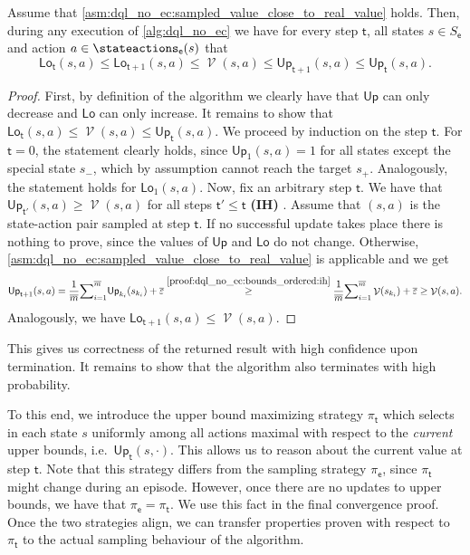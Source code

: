 \documentclass{theoretics}
\makeatletter
\newcommand{\States}{S}
\newcommand{\strategy}{\pi}
\DeclareMathOperator{\val}{\mathcal{V}}
\newcommand{\upperbound}{\mathsf{Up}}
\newcommand{\lowerbound}{\mathsf{Lo}}
\newcommand{\targetstate}{s_+}
\newcommand{\sinkstate}{s_-}
\newcommand{\updatestep}{{\overline{\varepsilon}}}
\newcommand{\delay}{{\overline{m}}}
\newcommand{\algostep}{\mathsf{t}}
\newcommand{\algoepisode}{\mathsf{e}}
\def\alabel#1#2{\begingroup
	\textbf{(#2)}\def\@currentlabel{\textbf{[#2]}}\phantomsection\label{#1}\endgroup
}
\makeatother
\begin{document}
\begin{lemma} \label{stm:dql_no_ec:bounds_ordered}
	Assume that \cref{asm:dql_no_ec:sampled_value_close_to_real_value} holds.
	Then, during any execution of \cref{alg:dql_no_ec} we have for every step $\algostep$, all states $s \in \States_\algoepisode$ and action $a \in \stateactions_\algoepisode(s)$ that
	\begin{equation*}
		\lowerbound_\algostep(s, a) \leq \lowerbound_{\algostep + 1}(s, a) \leq \val(s, a) \leq \upperbound_{\algostep + 1}(s, a) \leq \upperbound_\algostep(s, a).
	\end{equation*}
\end{lemma}

\begin{proof}
	First, by definition of the algorithm we clearly have that $\upperbound$ can only decrease and $\lowerbound$ can only increase.
	It remains to show that $\lowerbound_\algostep(s, a) \leq \val(s, a) \leq \upperbound_\algostep(s, a)$.
	We proceed by induction on the step $\algostep$.
	For $\algostep = 0$, the statement clearly holds, since $\upperbound_1(s, a) = 1$ for all states except the special state $\sinkstate$, which by assumption cannot reach the target $\targetstate$.
	Analogously, the statement holds for $\lowerbound_1(s, a)$.
	Now, fix an arbitrary step $\algostep$.
	We have that $\upperbound_{\algostep'}(s, a) \geq \val(s, a)$ for all steps $\algostep' \leq \algostep$ \alabel{proof:dql_no_ec:bounds_ordered:ih}{IH}.
	Assume that $(s, a)$ is the state-action pair sampled at step $\algostep$.
	If no successful update takes place there is nothing to prove, since the values of $\upperbound$ and $\lowerbound$ do not change.
	Otherwise, \cref{asm:dql_no_ec:sampled_value_close_to_real_value} is applicable and we get
	\begin{equation*}
		\upperbound_{\algostep + 1}(s, a) = \frac{1}{\delay} {\sum}_{i=1}^\delay \upperbound_{k_i}(s_{k_i}) + \updatestep \overset{\ref{proof:dql_no_ec:bounds_ordered:ih}}{\geq} \frac{1}{\delay} {\sum}_{i=1}^\delay \val(s_{k_i}) + \updatestep \geq \val(s, a).
	\end{equation*}
	Analogously, we have $\lowerbound_{\algostep + 1}(s, a) \leq \val(s, a)$. 
\end{proof}
This gives us correctness of the returned result with high confidence upon termination.
It remains to show that the algorithm also terminates with high probability.

To this end, we introduce the upper bound maximizing strategy $\strategy_\algostep$ which selects in each state $s$ uniformly among all actions maximal with respect to the \emph{current} upper bounds, i.e.\ $\upperbound_\algostep(s, \cdot)$.
This allows us to reason about the current value at step $\algostep$.
Note that this strategy differs from the sampling strategy $\strategy_\algoepisode$, since $\strategy_\algostep$ might change during an episode.
However, once there are no updates to upper bounds, we have that $\strategy_\algoepisode = \strategy_\algostep$.
We use this fact in the final convergence proof.
Once the two strategies align, we can transfer properties proven with respect to $\strategy_\algostep$ to the actual sampling behaviour of the algorithm.
\end{document}
